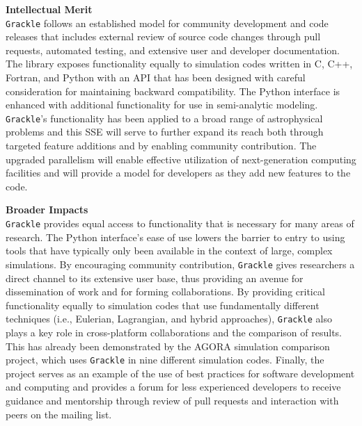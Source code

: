 \documentclass[11pt]{article}
\newcommand{\grackle}{\texttt{Grackle}}
\begin{document}
\begin{flushleft}
\noindent
{\bf \large Intellectual Merit}\\
\grackle{} follows an established model for community development and
code releases that includes external review of source code changes
through pull requests, automated testing, and extensive user and
developer documentation.  The library exposes functionality equally to
simulation codes written in C, C++, Fortran, and Python with an API
that has been designed with careful consideration for maintaining
backward compatibility.  The Python interface is enhanced with
additional functionality for use in semi-analytic modeling.
\grackle{}'s functionality has been applied to a broad range of
astrophysical problems and this SSE will serve to further expand its
reach both through targeted feature additions and by enabling
community contribution.  The upgraded parallelism will enable
effective utilization of next-generation computing facilities and will
provide a model for developers as they add new features to the code.

\noindent
{\bf \large Broader Impacts}\\
\grackle{} provides equal access to functionality that is
necessary for many areas of research.  The Python interface's ease of
use lowers the barrier to entry to using tools that have
typically only been available in the context of large, complex
simulations.  By encouraging community contribution, \grackle{} gives
researchers a direct channel to its extensive user base, thus
providing an avenue for dissemination of work and for forming
collaborations.  By providing critical functionality equally to
simulation codes that use fundamentally different techniques (i.e.,
Eulerian, Lagrangian, and hybrid approaches), \grackle{}
also plays a key role in cross-platform collaborations and the
comparison of results.  This has already been demonstrated by the
AGORA simulation comparison project, which uses \grackle{} in nine
different simulation codes.  Finally, the project serves as an example
of the use of best practices for software development and computing
and provides a forum for less experienced developers to receive
guidance and mentorship through review of pull requests and
interaction with peers on the mailing list.

\end{flushleft}
\end{document}

